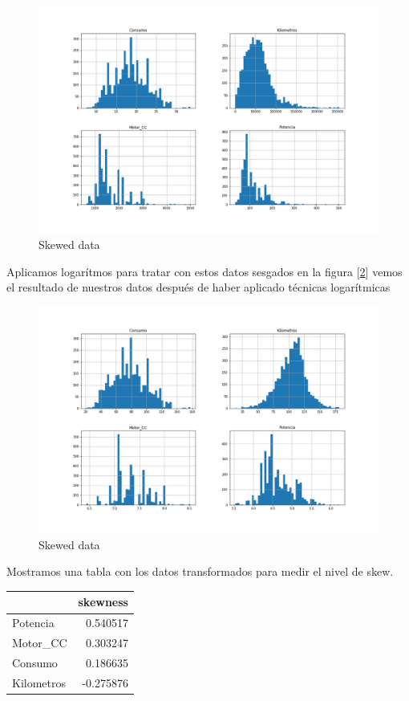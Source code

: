 \documentclass[12pt,twoside]{report}
\begin{document}
\begin{figure}[H]
\includegraphics[width=\textwidth]{../notebooks/figures/skewed_data.png}
\caption{Skewed data}
\label{fig:skewed_data}
\end{figure} 

Aplicamos logarítmos para tratar con estos datos sesgados en la figura [\ref{fig:no_skewed_data}] vemos el resultado de nuestros datos después de haber aplicado técnicas logarítmicas

\begin{figure}[H]
\includegraphics[width=\textwidth]{../notebooks/figures/no_skewed_data.png}
\caption{Skewed data}
\label{fig:no_skewed_data}
\end{figure} 

Mostramos una tabla con los datos transformados para medir el nivel de skew.
\begin{center}
\begin{tabular}{lr}
\toprule{} &  skewness \\
\midrule
Potencia   &  0.540517 \\
Motor\_CC   &  0.303247\\
Consumo    &  0.186635 \\
Kilometros & -0.275876 \\
\bottomrule
\end{tabular}
\end{center}
\end{document}
